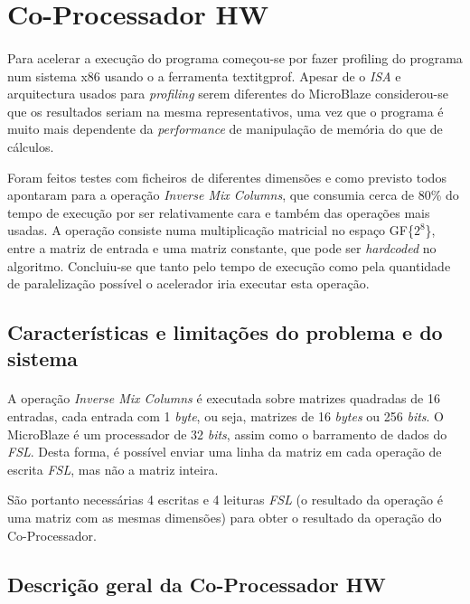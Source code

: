 \section{Co-Processador HW}

\paragraph{} Para acelerar a execução do programa começou-se por fazer profiling do programa num sistema x86 usando o a ferramenta textit{gprof}. Apesar de o \textit{ISA} e arquitectura usados para \textit{profiling} serem diferentes do MicroBlaze considerou-se que os resultados seriam na mesma representativos, uma vez que o programa é muito mais dependente da \textit{performance} de manipulação de memória do que de cálculos. 

Foram feitos testes com ficheiros de diferentes dimensões e como previsto todos apontaram para a operação \textit{Inverse Mix Columns}, que consumia cerca de 80\% do tempo de execução por ser relativamente cara e também das operações mais usadas.
A operação consiste numa multiplicação matricial no espaço GF\{$2^{8}$\}, entre a matriz de entrada e uma matriz constante, que pode ser \textit{hardcoded} no algoritmo.
Concluiu-se que tanto pelo tempo de execução como pela quantidade de paralelização possível o acelerador iria executar esta operação.

\subsection{Características e limitações do problema e do sistema}

\paragraph{} A operação \textit{Inverse Mix Columns} é executada sobre matrizes quadradas de 16 entradas, cada entrada com 1 \textit{byte}, ou seja, matrizes de 16 \textit{bytes} ou 256 \textit{bits}. O MicroBlaze é um processador de 32 \textit{bits}, assim como o barramento de dados do \textit{FSL}. Desta forma, é possível enviar uma linha da matriz em cada operação de escrita \textit{FSL}, mas não a matriz inteira.

São portanto necessárias 4 escritas e 4 leituras \textit{FSL} (o resultado da operação é uma matriz com as mesmas dimensões) para obter o resultado da operação do Co-Processador.

\subsection{Descrição geral da Co-Processador HW}
